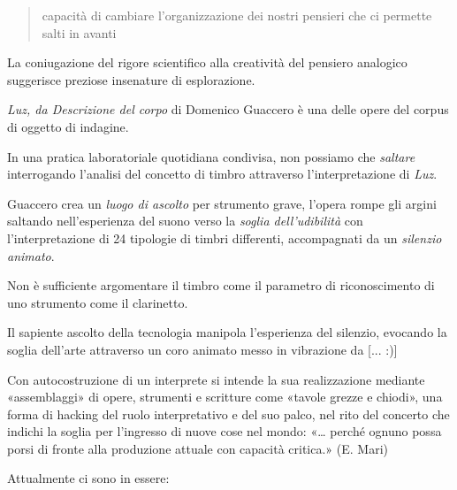 \documentclass{gs-adonis}
\begin{document}
\begin{quote}
  capacità di cambiare l'organizzazione dei nostri pensieri che ci permette
  salti in avanti
\end{quote}

La coniugazione del rigore scientifico alla creatività del pensiero analogico
suggerisce preziose insenature di esplorazione.

\emph{Luz, da Descrizione del corpo} di Domenico Guaccero è una delle opere del
corpus di oggetto di indagine.

In una pratica laboratoriale quotidiana condivisa, non possiamo che
\emph{saltare} interrogando l'analisi del concetto di timbro attraverso
l'interpretazione di \emph{Luz}.

Guaccero crea un \emph{luogo di ascolto} per strumento grave, l'opera rompe
gli argini saltando nell'esperienza del suono verso la
\emph{soglia dell'udibilità} con l'interpretazione di 24 tipologie di timbri
differenti, accompagnati da un \emph{silenzio animato}.

Non è sufficiente argomentare il timbro come il parametro di riconoscimento di
uno strumento come il clarinetto.

Il sapiente ascolto della tecnologia manipola l'esperienza del silenzio,
evocando la soglia dell'arte attraverso un coro animato messo in vibrazione da
[... :)]

Con autocostruzione di un interprete si intende la sua realizzazione mediante
«assemblaggi» di opere, strumenti e scritture come «tavole grezze e chiodi»,
una forma di hacking del ruolo interpretativo e del suo palco, nel rito del
concerto che indichi la soglia per l'ingresso di nuove cose nel mondo:
«… perché ognuno possa porsi di fronte alla produzione
attuale con capacità critica.» (E. Mari)


Attualmente ci sono in essere:
\end{document}
